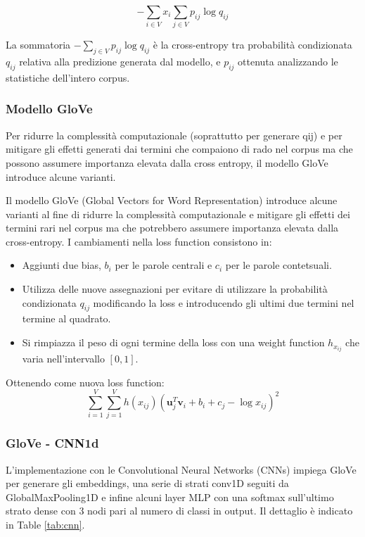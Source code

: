 \[-\sum_{i \in V} x_{i} \sum_{j \in V} p_{ij} \log q_{ij}\]

La sommatoria $-\sum_{j \in V} p_{ij} \log q_{ij}$ è la cross-entropy tra probabilità condizionata $q_{ij}$ relativa alla predizione generata dal modello, e $p_{ij}$ ottenuta analizzando le
statistiche dell'intero corpus.

\subsubsection{Modello GloVe}
Per ridurre la complessità computazionale (soprattutto per generare qij) e per mitigare gli effetti generati dai termini che compaiono di rado nel corpus ma che possono assumere importanza elevata dalla cross entropy, il modello GloVe introduce alcune varianti.


Il modello GloVe (Global Vectors for Word Representation) introduce alcune varianti al fine di ridurre la complessità computazionale e mitigare gli effetti dei termini rari nel corpus ma che potrebbero assumere importanza elevata dalla cross-entropy. I cambiamenti nella loss function consistono in:
\begin{itemize}
    \item Aggiunti due bias, $b_{i}$ per le parole centrali e $c_{i}$ per le parole contetsuali.  
    \item Utilizza delle nuove assegnazioni per evitare di utilizzare la probabilità condizionata $q_{ij}$ modificando la loss e introducendo gli ultimi due termini nel termine al quadrato.
    \item Si rimpiazza il peso di ogni termine della loss con una weight function $h_{x_{ij}}$ che varia nell'intervallo $[0,1]$.
\end{itemize}

Ottenendo come nuova loss function:
\[\sum_{i=1}^{V}\sum_{j=1}^{V} h(x_{ij}) \left( \mathbf{u}_j^T \mathbf{v}_i + b_i + c_j - \log x_{ij} \right)^2\]


  \subsubsection{GloVe - CNN1d}
  L'implementazione con le Convolutional Neural Networks (CNNs) impiega GloVe per generare gli embeddings, una serie di strati conv1D seguiti da GlobalMaxPooling1D e infine alcuni layer MLP con una softmax sull'ultimo strato dense con 3 nodi pari al numero di classi in output. Il dettaglio è indicato in Table \ref{tab:cnn}.

